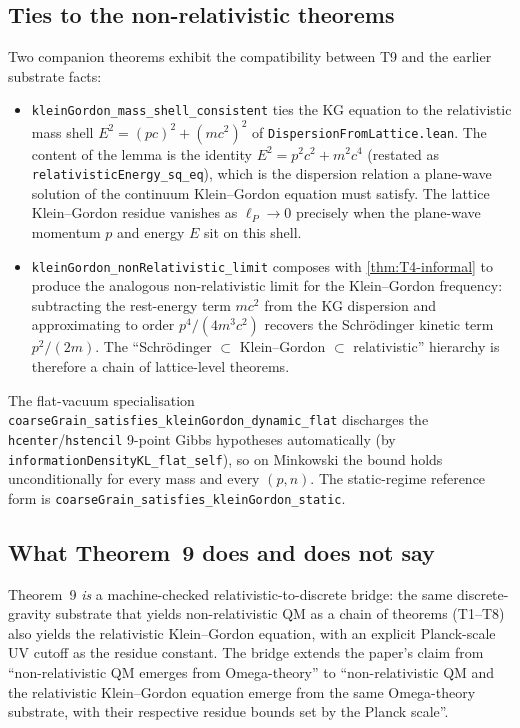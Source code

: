 \documentclass[11pt,a4paper,twoside]{article}
\theoremstyle{definition}
\newcommand{\lP}{\ell_P}
\newcommand{\code}[1]{\texttt{#1}}
\begin{document}
\subsection{Ties to the non-relativistic theorems}

Two companion theorems exhibit the compatibility between T9 and the
earlier substrate facts:

\begin{itemize}[leftmargin=1.4em]
\item \code{kleinGordon\_mass\_shell\_consistent} ties the KG equation
to the relativistic mass shell $E^{2} = (pc)^{2} + (mc^{2})^{2}$ of
\code{DispersionFromLattice.lean}. The content of the lemma is the
identity $E^{2} = p^{2}c^{2} + m^{2}c^{4}$ (restated as
\code{relativisticEnergy\_sq\_eq}), which is the dispersion relation
a plane-wave solution of the continuum Klein--Gordon equation must
satisfy. The lattice Klein--Gordon residue vanishes as $\lP \to 0$
precisely when the plane-wave momentum $p$ and energy $E$ sit on this
shell.

\item \code{kleinGordon\_nonRelativistic\_limit} composes with
\cref{thm:T4-informal} to produce the analogous non-relativistic
limit for the Klein--Gordon frequency: subtracting the rest-energy
term $mc^{2}$ from the KG dispersion and approximating to order
$p^{4}/(4 m^{3} c^{2})$ recovers the Schr\"odinger kinetic term
$p^{2}/(2m)$. The ``Schr\"odinger $\subset$ Klein--Gordon $\subset$
relativistic'' hierarchy is therefore a chain of lattice-level
theorems.
\end{itemize}

The flat-vacuum specialisation
\code{coarseGrain\_satisfies\_kleinGordon\_dynamic\_flat} discharges
the \code{hcenter}/\code{hstencil} 9-point Gibbs hypotheses
automatically (by \code{informationDensityKL\_flat\_self}), so on
Minkowski the bound holds unconditionally for every mass and every
$(p, n)$. The static-regime reference form is
\code{coarseGrain\_satisfies\_kleinGordon\_static}.

\subsection{What Theorem~9 does and does not say}

Theorem~9 \emph{is} a machine-checked relativistic-to-discrete bridge:
the same discrete-gravity substrate that yields non-relativistic QM
as a chain of theorems (T1--T8) also yields the relativistic
Klein--Gordon equation, with an explicit Planck-scale UV cutoff as the
residue constant. The bridge extends the paper's claim from
``non-relativistic QM emerges from Omega-theory'' to
``non-relativistic QM and the relativistic Klein--Gordon equation
emerge from the same Omega-theory substrate, with their respective
residue bounds set by the Planck scale''.
\end{document}
